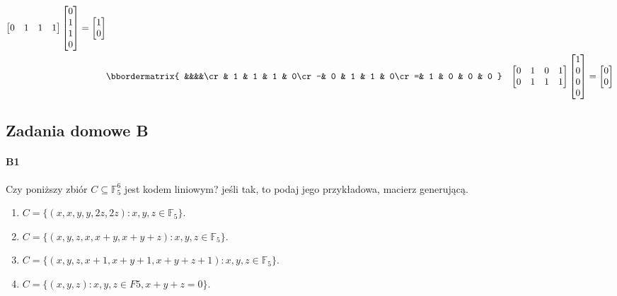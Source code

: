 \begin{enumerate}[label=\alph*)]
\begin{align*}
\begin{bmatrix}
0& 1& 1& 1 
\end{bmatrix}\begin{bmatrix}
0\\1\\1\\0
\end{bmatrix}=\begin{bmatrix}
1\\0
\end{bmatrix}\\
&\bbordermatrix{
&&&&\cr
 & 1 & 1 & 1 & 0\cr
-& 0 & 1 & 1 & 0\cr
=& 1 & 0 & 0 & 0
}& \begin{bmatrix}
0& 1& 0& 1\\
0& 1& 1& 1 
\end{bmatrix}\begin{bmatrix}
1\\0\\0\\0
\end{bmatrix}=\begin{bmatrix}
0\\0
\end{bmatrix}\\
\end{align*}
\end{enumerate}


\subsection{Zadania domowe B}
\paragraph{B1} Czy poniższy zbiór $C\subseteq \mathbb{F}^6_5$ jest kodem liniowym? jeśli tak, to podaj jego przykładowa, macierz generującą.
\begin{enumerate}[label=\alph*)]
\item $C = \{(x, x, y, y, 2z, 2z): x, y, z \in \mathbb{F}_5\}$.
\item $C = \{(x, y, z, x, x + y, x + y + z): x, y, z \in \mathbb{F}_5\}$.
\item $C = \{(x, y, z, x + 1, x + y + 1, x + y + z + 1): x, y, z \in \mathbb{F}_5\}$.
\item $C = \{(x, y, z): x, y, z \in F5, x + y + z = 0\}$.
\end{enumerate}

